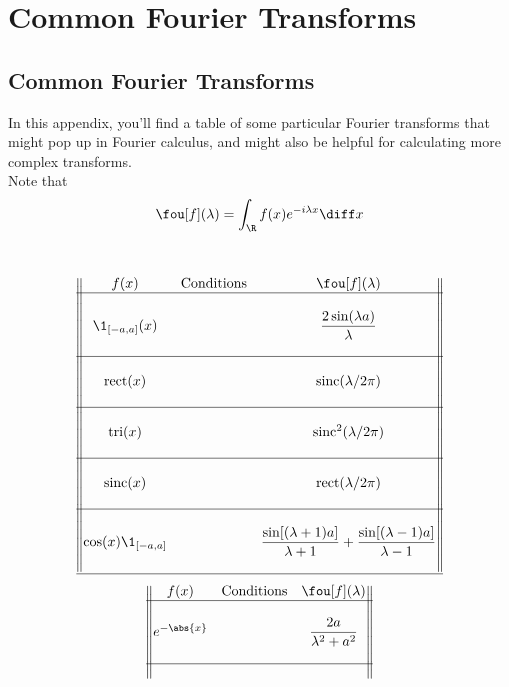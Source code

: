 \documentclass[../mmf.tex]{subfiles}
\begin{document}
\chapter{Common Fourier Transforms}
\section{Common Fourier Transforms}
In this appendix, you'll find a table of some particular Fourier transforms that might pop up in Fourier calculus, and might also be helpful for calculating more complex transforms.\\
Note that
\begin{equation}
	\fou[f](\lambda)=\int_{\R} f(x)e^{-i\lambda x}\diff x
\end{equation}
\\
\begin{center}
\begin{equation*}
	\begin{Vmatrix}
		f(x) &\text{Conditions}& \fou[f](\lambda) \\
		\hline\\
		\1_{[-a,a]}(x) && \dfrac{2\sin(\lambda a)}{\lambda} \\
		\\\hline\\
		 \mathrm{rect}(x) && \mathrm{sinc}(\lambda/2\pi) \\
		\\\hline\\
		 \mathrm{tri}(x) && \mathrm{sinc}^2(\lambda/2\pi) \\
		\\\hline\\
		 \mathrm{sinc}(x) && \mathrm{rect}(\lambda/2\pi) \\
		\\\hline\\
		\cos(x)\1_{[-a,a]} && \dfrac{\sin[(\lambda+1)a]}{\lambda+1}+\dfrac{\sin[(\lambda-1)a]}{\lambda-1} \\
		\\\hline
	\end{Vmatrix}
\end{equation*}
\begin{equation*}
	\begin{Vmatrix}
		f(x) & \text{Conditions} & \fou[f](\lambda) \\
		\hline\\
		e^{-\abs{x}} & & \dfrac{2a}{\lambda^2+a^2} \\
		\\\hline\\

\end{Vmatrix}
\end{equation*}
\end{center}
\end{document}
